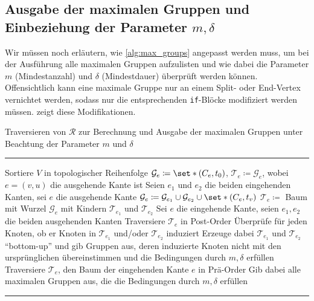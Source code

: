\subsection{Ausgabe der maximalen Gruppen und Einbeziehung der Parameter $m,\delta$} %
\label{sub:ausgabe_der_maximalen_gruppen_und_einbeziehung_der_parameter_m_delta}
Wir müssen noch erläutern, wie \cref{alg:max_groups} angepasst werden muss, um bei der Ausführung alle maximalen Gruppen aufzulisten und wie dabei die Parameter $m$ (Mindestanzahl) und $\delta$ (Mindestdauer) überprüft werden können.
Offensichtlich kann eine maximale Gruppe nur an einem Split- oder End-Vertex vernichtet werden, sodass nur die entsprechenden \texttt{if}-Blöcke modifiziert werden müssen.
 zeigt diese Modifikationen.
\begin{algorithm}[hbt]
	\caption{Traversieren von $\mathcal{R}$ zur Berechnung und Ausgabe der maximalen Gruppen unter Beachtung der Parameter $m$ und $\delta$} \label{alg:max_groups_final}
	\vspace{.5em}
	\hrule\vspace{.5em}
	
	\begin{algorithmic}
		\State Sortiere $V$ in topologischer Reihenfolge
			\State $\mathcal{G}_e \coloneqq \set*{(C_e,t_0)}$, $\mathcal{T}_e \coloneqq \mathcal{G}_e$, wobei $e=(v,u)$ die ausgehende Kante ist
			\State Seien $e_1$ und $e_2$ die beiden eingehenden Kanten, sei $e$ die ausgehende Kante
			\State $\mathcal{G}_e \coloneqq \mathcal{G}_{e_1} \cup \mathcal{G}_{e_2} \cup \set*{(C_e,t_v)}$
			\State $\mathcal{T}_e \coloneqq$ Baum mit Wurzel $\mathcal{G}_e$ mit Kindern $\mathcal{T}_{e_1}$ und $\mathcal{T}_{e_2}$
			\State Sei $e$ die eingehende Kante, seien $e_1,e_2$ die beiden ausgehenden Kanten
			\State Traversiere $\mathcal{T}_e$ in Post-Order
			\State Überprüfe für jeden Knoten, ob er Knoten in $\mathcal{T}_{e_1}$ und/oder $\mathcal{T}_{e_2}$ induziert
			\State Erzeuge dabei $\mathcal{T}_{e_1}$ und $\mathcal{T}_{e_2}$ \enquote{bottom-up} und gib Gruppen aus, deren induzierte Knoten
			\State nicht mit den ursprünglichen übereinstimmen und die Bedingungen durch $m, \delta$ erfüllen
			\State Traversiere $\mathcal{T}_e$, den Baum der eingehenden Kante $e$ in Prä-Order
			\State Gib dabei alle maximalen Gruppen aus, die die Bedingungen durch $m,\delta$ erfüllen
			\EndIf
		\EndFor
		\EndProcedure
	\end{algorithmic}
	\hrule
\end{algorithm}

